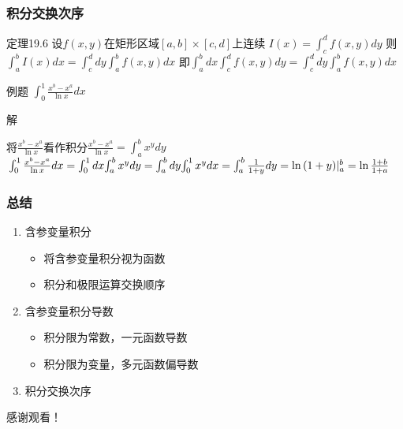 \documentclass[xetex]{beamer}
\begin{document}
\begin{frame}
    \frametitle{积分交换次序}
    \begin{block}{定理19.6}
        设$f(x,y)$在矩形区域$[a,b]\times[c,d]$上连续
        $I(x)=\int_{c}^{d}{f(x,y)dy}$
        则$\int_{a}^{b}{I(x)dx}=\int_{c}^{d}{dy}\int_{a}^{b}{f(x,y)dx}$
        即$\int_{a}^{b}{dx}\int_{c}^{d}{f(x,y)dy}=\int_{c}^{d}{dy}\int_{a}^{b}{f(x,y)dx}$
    \end{block}
    \begin{block}{例题}
        $\int_{0}^{1}{\frac{x^b-x^a}{\ln{x}}dx}$
    \end{block}

    \begin{block}{解}

        将$\frac{x^b-x^a}{\ln{x}}$看作积分$\frac{x^b-x^a}{\ln{x}}=\int_a^b{x^ydy}$
        $\newline\int_{0}^{1}{\frac{x^b-x^a}{\ln{x}}dx}=\int_{0}^{1}{dx}{\int_a^b{x^ydy}}
        =\int_{a}^{b}{dy}{\int_0^1{x^ydx}}
        \newline=\int_a^b{\frac{1}{1+y}dy}=\ln{(1+y)}|^b_a=\ln{\frac{1+b}{1+a}}$

    \end{block}
\end{frame}



\begin{frame}
    \frametitle{总结}
    \begin{enumerate}
        \item 含参变量积分
        \begin{itemize}
            \item 将含参变量积分视为函数
            \item 积分和极限运算交换顺序
        \end{itemize}
        \item 含参变量积分导数
        \begin{itemize}
            \item 积分限为常数，一元函数导数
            \item 积分限为变量，多元函数偏导数
        \end{itemize}
        \item 积分交换次序
    \end{enumerate}

\end{frame}

\begin{frame}[standout]
    \Huge 感谢观看！

\end{frame}
\end{document}
